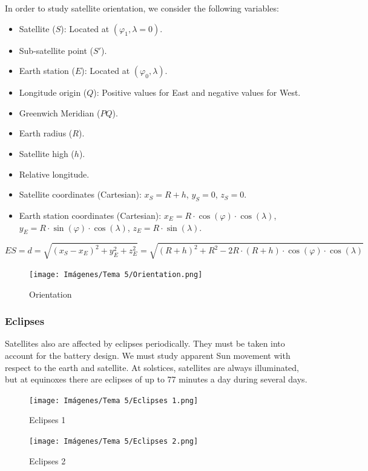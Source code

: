 \documentclass[
	12pt,
	twoside
]{book}
\begin{document}
In order to study satellite orientation, we consider the following variables:
\begin{itemize}
	\item Satellite ($S$): Located at $(\varphi_1, \lambda = 0)$.
	\item Sub-satellite point ($S'$).
	\item Earth station ($E$): Located at $(\varphi_0, \lambda)$.
	\item Longitude origin ($Q$): Positive values for East and negative values for West.
	\item Greenwich Meridian ($PQ$).
	\item Earth radius ($R$).
	\item Satellite high ($h$).
	\item Relative longitude.
	\item Satellite coordinates (Cartesian): $x_S = R + h$, $y_S = 0$, $z_S = 0$.
	\item Earth station coordinates (Cartesian): $x_E = R \cdot \cos(\varphi) \cdot \cos(\lambda)$, $y_E = R \cdot \sin(\varphi) \cdot \cos(\lambda)$, $z_E = R \cdot \sin(\lambda)$.
\end{itemize}

$$
	ES = d =
	\sqrt{ (x_S - x_E )^2 + y_{E}^2 + z_{E}^2 } =
	\sqrt{ ( R + h )^2 + R^2 - 2 R \cdot (R+h) \cdot \cos(\varphi) \cdot \cos(\lambda) }
$$

\begin{figure}[H]
	\centering
	\texttt{[image: Imágenes/Tema 5/Orientation.png]}
	\caption{
		\label{fig:unit5_Orientation}
		Orientation
	}
\end{figure}

\subsubsection{Eclipses}

Satellites also are affected by eclipses periodically. They must be taken into account for the battery design. We must study apparent Sun movement with respect to the earth and satellite. At solstices, satellites are always illuminated, but at equinoxes there are eclipses of up to 77 minutes a day during several days.

\begin{figure}[H]
	\centering
	\texttt{[image: Imágenes/Tema 5/Eclipses 1.png]}
	\caption{
		\label{fig:unit5_Eclipses_1}
		Eclipses 1
	}
\end{figure}

\begin{figure}[H]
	\centering
	\texttt{[image: Imágenes/Tema 5/Eclipses 2.png]}
	\caption{
		\label{fig:unit5_Eclipses_2}
		Eclipses 2
	}
\end{figure}
\end{document}

